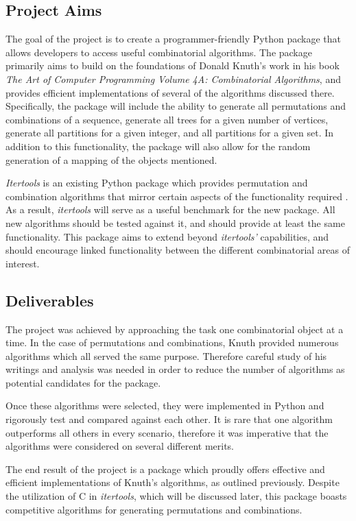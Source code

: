 \documentclass[12pt]{article}
\begin{document}
\subsection{Project Aims}
The goal of the project is to create a programmer-friendly Python package that allows developers to access useful combinatorial algorithms. The package primarily aims to build on the foundations of Donald Knuth’s work in his book \textit{The Art of Computer Programming Volume 4A: Combinatorial Algorithms}, and provides efficient implementations of several of the algorithms discussed there. Specifically, the package will include the ability to generate all permutations and combinations of a sequence, generate all trees for a given number of vertices, generate all partitions for a given integer, and all partitions for a given set. In addition to this functionality, the package will also allow for the random generation of a mapping of the objects mentioned.

\textit{Itertools} is an existing Python package which provides permutation and combination algorithms that mirror certain aspects of the functionality required \cite{itertools}. As a result, \textit{itertools} will serve as a useful benchmark for the new package. All new algorithms should be tested against it, and should provide at least the same functionality. This package aims to extend beyond \textit{itertools'} capabilities, and should encourage linked functionality between the different combinatorial areas of interest.

\subsection{Deliverables}
The project was achieved by approaching the task one combinatorial object at a time. In the case of permutations and combinations, Knuth provided numerous algorithms which all served the same purpose. Therefore careful study of his writings and analysis was needed in order to reduce the number of algorithms as potential candidates for the package. 

Once these algorithms were selected, they were implemented in Python and rigorously test and compared against each other. It is rare that one algorithm outperforms all others in every scenario, therefore it was imperative that the algorithms were considered on several different merits. 

The end result of the project is a package which proudly offers effective and efficient implementations of Knuth's algorithms, as outlined previously. Despite the utilization of C in \textit{itertools}, which will be discussed later, this package boasts competitive algorithms for generating permutations and combinations.
\pagebreak
\end{document}
